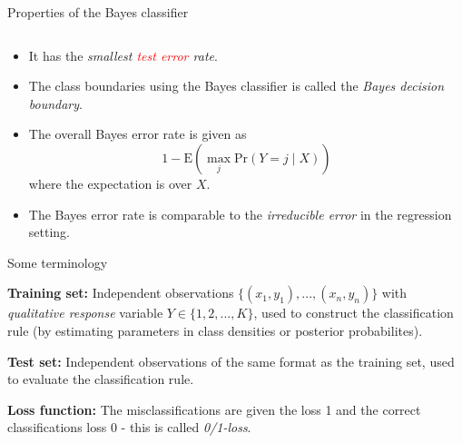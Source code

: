 \documentclass[10pt,ignorenonframetext,]{beamer}
\providecommand{\tightlist}{%
  \setlength{\itemsep}{0pt}\setlength{\parskip}{0pt}}
\begin{document}
\begin{frame}

\begin{block}{Properties of the Bayes classifier}

\(~\)

\begin{itemize}
\tightlist
\item
  It has the \emph{smallest \textcolor{red}{test error} rate}.
\end{itemize}

\vspace{2mm}

\begin{itemize}
\tightlist
\item
  The class boundaries using the Bayes classifier is called the
  \emph{Bayes decision boundary}.
\end{itemize}

\vspace{2mm}

\begin{itemize}
\tightlist
\item
  The overall Bayes error rate is given as
  \[1-\text{E}(\max_j \text{Pr}(Y=j\mid X))\] where the expectation is
  over \(X\).
\end{itemize}

\vspace{2mm}

\begin{itemize}
\tightlist
\item
  The Bayes error rate is comparable to the \emph{irreducible error} in
  the regression setting.
\end{itemize}

\end{block}

\end{frame}

\begin{frame}{Some terminology}
\protect\hypertarget{some-terminology}{}

\vspace{2mm}

\textbf{Training set:} Independent observations
\(\{(x_1, y_1), ..., (x_n, y_n)\}\) with \emph{qualitative response}
variable \(Y \in \{1, 2, ..., K\}\), used to construct the
classification rule (by estimating parameters in class densities or
posterior probabilites).

\vspace{2mm}

\textbf{Test set:} Independent observations of the same format as the
training set, used to evaluate the classification rule.

\vspace{2mm}

\textbf{Loss function:} The misclassifications are given the loss 1 and
the correct classifications loss 0 - this is called \emph{0/1-loss}.

\end{frame}
\end{document}
